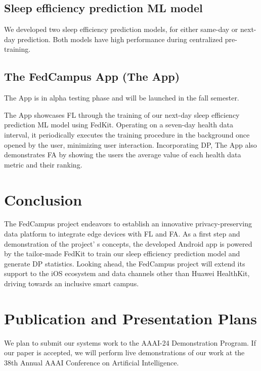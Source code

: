 \documentclass{article}
\begin{document}
\subsection{Sleep efficiency prediction ML model}

We developed two sleep efficiency prediction models, for either same-day
or next-day prediction. Both models have high performance during
centralized pre-training.

\subsection{The FedCampus App (The App)}

The App is in alpha testing phase and will be launched in the fall
semester.

The App showcases FL through the training of our next-day sleep
efficiency prediction ML model using FedKit. Operating on a seven-day
health data interval, it periodically executes the training procedure in
the background once opened by the user, minimizing user interaction.
Incorporating DP, The App also demonstrates FA by showing the users the
average value of each health data metric and their ranking.

\section{Conclusion}

The FedCampus project endeavors to establish an innovative
privacy-preserving data platform to integrate edge devices with FL and
FA. As a first step and demonstration of the project' s
concepts, the developed Android app is powered by the tailor-made FedKit
to train our sleep efficiency prediction model and generate DP
statistics. Looking ahead, the FedCampus project will extend its support
to the iOS ecosystem and data channels other than Huawei HealthKit,
driving towards an inclusive smart campus.

\section{Publication and Presentation Plans}

We plan to submit our systems work to the AAAI-24 Demonstration Program.
If our paper is accepted, we will perform live demonstrations of our
work at the 38th Annual AAAI Conference on Artificial Intelligence.
\end{document}
